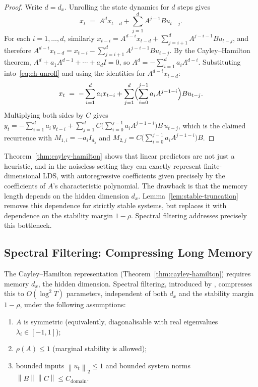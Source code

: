 \documentclass[11pt]{article}
\theoremstyle{plain}
\theoremstyle{definition}
\theoremstyle{remark}
\newcommand{\norm}[1]{\left\lVert#1\right\rVert}
\begin{document}
\begin{proof}
Write $d = d_x$. Unrolling the state dynamics for $d$ steps gives
\begin{equation}
    x_t \;=\; A^d x_{t-d} + \sum_{j=1}^{d} A^{j-1} B u_{t-j}.
    \label{eq:ch-unroll}
\end{equation}
For each $i = 1, \ldots, d$, similarly $x_{t-i} = A^{d-i} x_{t-d} + \sum_{j=i+1}^{d} A^{j-i-1} B u_{t-j}$, and therefore $A^{d-i} x_{t-d} = x_{t-i} - \sum_{j=i+1}^{d} A^{j-i-1} B u_{t-j}$. By the Cayley--Hamilton theorem, $A^d + a_1 A^{d-1} + \cdots + a_d I = 0$, so $A^d = -\sum_{i=1}^{d} a_i A^{d-i}$. Substituting into~\eqref{eq:ch-unroll} and using the identities for $A^{d-i} x_{t-d}$:
\[
    x_t \;=\; -\sum_{i=1}^{d} a_i x_{t-i} + \sum_{j=1}^{d} \Bigl(\sum_{i=0}^{j-1} a_i A^{j-1-i}\Bigr) B u_{t-j}.
\]
Multiplying both sides by $C$ gives $y_t = -\sum_{i=1}^{d} a_i\, y_{t-i} + \sum_{j=1}^{d} C\bigl(\sum_{i=0}^{j-1} a_i A^{j-1-i}\bigr) B\, u_{t-j}$, which is the claimed recurrence with $M_{1,i} = -a_i I_{d_y}$ and $M_{2,j} = C\bigl(\sum_{i=0}^{j-1} a_i A^{j-1-i}\bigr) B$.
\end{proof}

Theorem~\ref{thm:cayley-hamilton} shows that linear predictors are not just a heuristic, and in the noiseless setting they can exactly represent finite-dimensional LDS, with autoregressive coefficients given precisely by the coefficients of $A$'s characteristic polynomial. The drawback is that the memory length depends on the hidden dimension $d_x$. Lemma~\ref{lem:stable-truncation} removes this dependence for strictly stable systems, but replaces it with dependence on the stability margin $1 - \rho$. Spectral filtering addresses precisely this bottleneck.

\subsection{Spectral Filtering: Compressing Long Memory}
\label{sec:spectral-filtering-prelim}

The Cayley--Hamilton representation (Theorem~\ref{thm:cayley-hamilton}) requires memory $d_x$, the hidden dimension. Spectral filtering, introduced by \citet{hazan2017learning}, compresses this to $O(\log^2 T)$ parameters, independent of both $d_x$ and the stability margin $1 - \rho$, under the following assumptions:
\begin{enumerate}[leftmargin=1.5em, itemsep=0.1em, topsep=0.2em]
    \item $A$ is symmetric (equivalently, diagonalisable with real eigenvalues $\lambda_i \in [-1, 1]$);
    \item $\rho(A) \leq 1$ (marginal stability is allowed);
    \item bounded inputs $\norm{u_t}_2 \leq 1$ and bounded system norms $\norm{B}\norm{C} \leq C_{\mathrm{domain}}$.
\end{enumerate}
\end{document}
